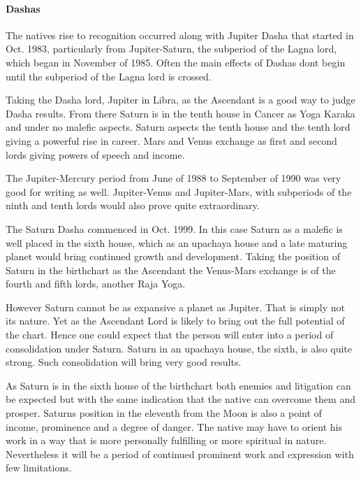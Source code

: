  

\paragraph{Dashas}

The natives rise to recognition occurred along with Jupiter Dasha that started in Oct. 1983, particularly from Jupiter-Saturn, the subperiod of the Lagna lord, which began in November of 1985. Often the main effects of Dashas dont begin until the subperiod of the Lagna lord is crossed.

 

Taking the Dasha lord, Jupiter in Libra, as the Ascendant is a good way to judge Dasha results. From there Saturn is in the tenth house in Cancer as Yoga Karaka and under no malefic aspects. Saturn aspects the tenth house and the tenth lord giving a powerful rise in career. Mars and Venus exchange as first and second lords giving powers of speech and income.

 

The Jupiter-Mercury period from June of 1988 to September of 1990 was very good for writing as well. Jupiter-Venus and Jupiter-Mars, with subperiods of the ninth and tenth lords would also prove quite extraordinary.

 

The Saturn Dasha commenced in Oct. 1999. In this case Saturn as a malefic is well placed in the sixth house, which as an upachaya house and a late maturing planet would bring continued growth and development. Taking the position of Saturn in the birthchart as the Ascendant the Venus-Mars exchange is of the fourth and fifth lords, another Raja Yoga.

 

However Saturn cannot be as expansive a planet as Jupiter. That is simply not its nature. Yet as the Ascendant Lord is likely to bring out the full potential of the chart. Hence one could expect that the person will enter into a period of consolidation under Saturn. Saturn in an upachaya house, the sixth, is also quite strong. Such consolidation will bring very good results.

 

As Saturn is in the sixth house of the birthchart both enemies and litigation can be expected but with the same indication that the native can overcome them and prosper. Saturns position in the eleventh from the Moon is also a point of income, prominence and a degree of danger. The native may have to orient his work in a way that is more personally fulfilling or more spiritual in nature. Nevertheless it will be a period of continued prominent work and expression with few limitations.

